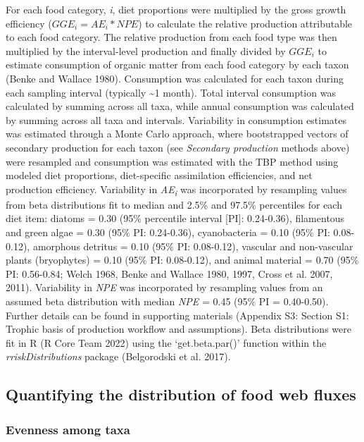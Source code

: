 \documentclass[
]{article}
\numberwithin{equation}
\begin{document}
For each food category, \emph{i}, diet proportions were multiplied by
the gross growth efficiency (\(GGE_{i} = AE_{i} * NPE\)) to calculate
the relative production attributable to each food category. The relative
production from each food type was then multiplied by the interval-level
production and finally divided by \(GGE_{i}\) to estimate consumption of
organic matter from each food category by each taxon (Benke and Wallace
1980). Consumption was calculated for each taxon during each sampling
interval (typically \textasciitilde1 month). Total interval consumption
was calculated by summing across all taxa, while annual consumption was
calculated by summing across all taxa and intervals. Variability in
consumption estimates was estimated through a Monte Carlo approach,
where bootstrapped vectors of secondary production for each taxon (see
\emph{Secondary production} methods above) were resampled and
consumption was estimated with the TBP method using modeled diet
proportions, diet-specific assimilation efficiencies, and net production
efficiency. Variability in \emph{AE\textsubscript{i}} was incorporated
by resampling values from beta distributions fit to median and 2.5\% and
97.5\% percentiles for each diet item: diatoms = 0.30 (95\% percentile
interval {[}PI{]}: 0.24-0.36), filamentous and green algae = 0.30 (95\%
PI: 0.24-0.36), cyanobacteria = 0.10 (95\% PI: 0.08-0.12), amorphous
detritus = 0.10 (95\% PI: 0.08-0.12), vascular and non-vascular plants
(bryophytes) = 0.10 (95\% PI: 0.08-0.12), and animal material = 0.70
(95\% PI: 0.56-0.84; Welch 1968, Benke and Wallace 1980, 1997, Cross et
al. 2007, 2011). Variability in \emph{NPE} was incorporated by
resampling values from an assumed beta distribution with median
\emph{NPE} = 0.45 (95\% PI = 0.40-0.50). Further details can be found in
supporting materials (Appendix S3: Section S1: Trophic basis of
production workflow and assumptions). Beta distributions were fit in R
(R Core Team 2022) using the `get.beta.par()' function within the
\emph{rriskDistributions} package (Belgorodski et al. 2017).

\hypertarget{quantifying-the-distribution-of-food-web-fluxes}{%
\subsection{Quantifying the distribution of food web
fluxes}\label{quantifying-the-distribution-of-food-web-fluxes}}

\hypertarget{evenness-among-taxa}{%
\subsubsection{Evenness among taxa}\label{evenness-among-taxa}}
\end{document}
